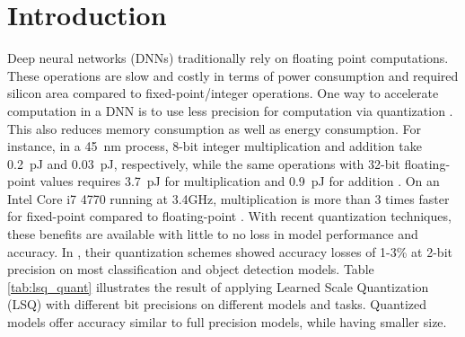 \documentclass[sigconf]{acmart}
\begin{document}


\maketitle

\section{Introduction}
Deep neural networks (DNNs) traditionally rely on floating point computations. These operations are slow and costly in terms of power consumption and required silicon area compared to fixed-point/integer operations. One way to accelerate computation in a DNN is to use less precision for computation via quantization \cite{DBLP:journals/corr/HubaraCSEB16}. This also reduces memory consumption as well as energy consumption. For instance, in a 45~nm process, 
8-bit integer multiplication and addition take 0.2~pJ and 0.03~pJ, respectively, while the same operations with 32-bit floating-point values requires 3.7~pJ for multiplication and 0.9~pJ for addition \cite{IEEE:ISSCC}. On an Intel Core i7 4770 running at 3.4GHz, multiplication is more than 3 times faster for fixed-point compared to floating-point \cite{LIMARE}.
With recent quantization techniques, these benefits are available with little to no loss in model performance and accuracy. In \cite{Esser2020LEARNED,lee2021network}, their quantization schemes showed accuracy losses of 1-3\% at 2-bit precision on most classification and object detection models.
Table \ref{tab:lsq_quant} illustrates the result of applying Learned Scale Quantization (LSQ) \cite{Esser2020LEARNED} with different bit precisions on different models and tasks. Quantized models offer accuracy similar to full precision models, while having smaller size.
\end{document}
